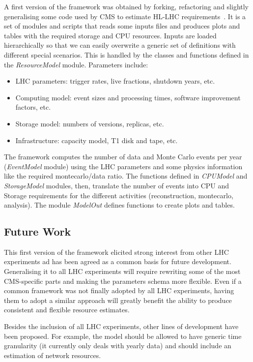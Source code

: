 A first version of the framework \cite{ourresmodel} was obtained by
forking, refactoring and slightly generalising some code
used by CMS to estimate HL-LHC requirements~\cite{cmsresmodel}. It is
a set of modules and scripts that reads some inputs files and
produces plots and tables with the required storage and CPU
resources. Inputs are loaded hierarchically so that we can easily
overwrite a generic set of definitions with different special
scenarios. This is handled by the classes and functions defined in the
{\it ResourceModel} module. Parameters include:
\begin{itemize}
\item LHC parameters: trigger rates, live fractions, shutdown years, etc.
\item Computing model: event sizes and processing times, software improvement factors, etc.
\item Storage model: numbers of versions, replicas, etc.
\item Infrastructure: capacity model, T1 disk and tape, etc.
\end{itemize}
The framework computes the number of data and Monte Carlo events
per year ({\it EventModel} module) using the LHC parameters and some
physics information like the required montecarlo/data ratio. The
functions defined in {\it CPUModel} and {\it StorageModel} modules,
then, translate the number of events into CPU and Storage requirements
for the different activities (reconstruction, montecarlo, analysis).
The module {\it ModelOut} defines functions to create plots and tables.

\subsection{Future Work}

This first version of the framework elicited strong interest from
other LHC experiments ad has been agreed as a common basis for future
development. Generalising it to all LHC experiments will require
rewriting some of the most CMS-specific parts and making the
parameters schema more flexible. Even if a common framework was not
finally adopted by all LHC experiments, having them to adopt a similar
approach will greatly benefit the ability to produce consistent and
flexible resource estimates.

Besides the inclusion of all LHC experiments, other lines of
development have been proposed.  For example, the model should be
allowed to have generic time granularity (it currently only deals with
yearly data) and should include an estimation of network resources.


